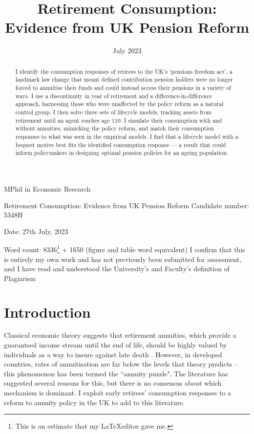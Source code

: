 \documentclass[12pt]{article}
\date{July 2023}
\title{Retirement Consumption: Evidence from UK Pension Reform}
\begin{document}
\begin{titlepage}
    \begin{center}

        \normalsize
        {MPhil in Economic Research}
        \vfill

        \huge
        Retirement Consumption: Evidence from UK Pension Reform
        \vfill
        \normalsize
        Candidate number: 5348H

        Date: 27th July, 2023

        Word count: 8336\footnote{This is an estimate that my \LaTeX editor gave me.} + 1650 (figure and table word equivalent)
        \vfill
        I confirm that this is entirely my own work and has not previously been submitted for assessment, and I have read and understood the University’s and Faculty’s definition of Plagiarism
    \end{center}
\end{titlepage}
\newpage
\maketitle
\begin{abstract}
    I identify the consumption responses of retirees to the UK's `pensions
    freedom act', a landmark law change that meant defined contribution pension
    holders were no longer forced to annuitise their funds and could instead
    access their pensions in a variety of ways. I use a discontinuity in year of
    retirement and a difference-in-difference approach, harnessing those who
    were unaffected by the policy reform as a natural control group. I then
    solve three sets of lifecycle models, tracking assets from retirement until an
    agent reaches age 110. I simulate their consumption with and without
    annuities, mimicking the policy reform, and match their consumption
    responses to what was seen in the empirical models. I find that a lifecycle
    model with a bequest motive best fits the identified consumption response —
    a result that could inform policymakers in designing optimal pension
    policies for an ageing population.
\end{abstract}
\newpage
\tableofcontents
\newpage

\section{Introduction}
Classical economic theory suggests that retirement annuities, which provide a
guaranteed income stream until the end of life, should be highly valued by
individuals as a way to insure against late death \citep{yaari_65}. However, in
developed countries, rates of annuitisation are far below the levels that theory
predicts -- this phenomenon has been termed the ``annuity puzzle". The literature
has suggested several reasons for this, but there is no consensus about which
mechanism is dominant. I exploit early retirees' consumption responses to a
reform to annuity policy in the UK to add to this literature.
\end{document}

